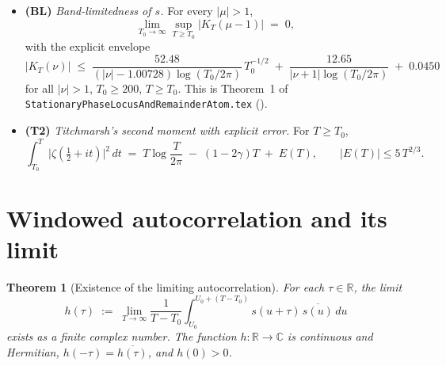 \documentclass[11pt]{article}
\newtheorem{theorem}{Theorem}
\theoremstyle{definition}
\begin{document}
\begin{itemize}[leftmargin=1.6em]
\item\textbf{(BL)} \emph{Band-limitedness of $s$.} For every $|\mu|>1$,
\begin{equation}\label{eq:BL}
\lim_{T_{0}\to\infty}\sup_{T\ge T_{0}}\bigl|K_{T}(\mu-1)\bigr|\;=\;0,
\end{equation}
with the explicit envelope
\begin{equation}\label{eq:BLexplicit}
|K_{T}(\nu)|\;\le\;\frac{52.48}{(|\nu|-1.00728)\log(T_{0}/2\pi)}\,T_{0}^{-1/2}
\;+\;\frac{12.65}{|\nu+1|\log(T_{0}/2\pi)}\;+\;0.0450
\end{equation}
for all $|\nu|>1$, $T_{0}\ge 200$, $T\ge T_{0}$.
This is Theorem~1 of \texttt{StationaryPhaseLocusAndRemainderAtom.tex}
(\cite[Theorem~1, §5]{exposition}).

\item\textbf{(T2)} \emph{Titchmarsh's second moment with explicit error.}
For $T\ge T_{0}$,
\begin{equation}\label{eq:T2}
\int_{T_{0}}^{T}\!\bigl|\zeta(\tfrac{1}{2}+it)\bigr|^{2}\,dt
\;=\; T\log\frac{T}{2\pi}\;-\;(1-2\gamma)T\;+\;E(T),\qquad
|E(T)|\le 5\,T^{2/3}.
\end{equation}
\end{itemize}

\section{Windowed autocorrelation and its limit}\label{sec:h}

\begin{theorem}[Existence of the limiting autocorrelation]\label{thm:h}
For each $\tau\in\mathbb{R}$, the limit
\begin{equation}\label{eq:h}
h(\tau) \;:=\; \lim_{T\to\infty}\frac{1}{T-T_{0}}\int_{U_{0}}^{U_{0}+(T-T_{0})}\!
s(u+\tau)\,\overline{s(u)}\,du
\end{equation}
exists as a finite complex number. The function $h:\mathbb{R}\to\mathbb{C}$
is continuous and Hermitian, $h(-\tau)=\overline{h(\tau)}$, and $h(0)>0$.
\end{theorem}
\end{document}
